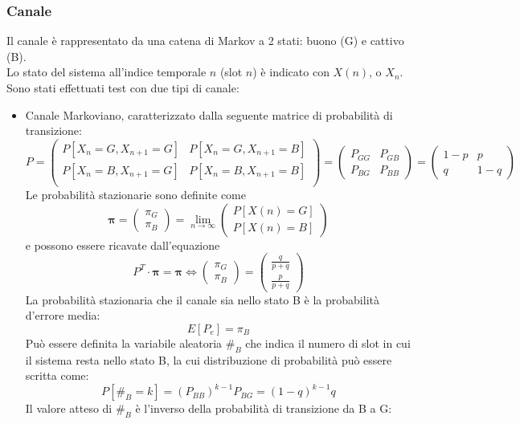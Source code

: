\documentclass[italian, a4paper, 12pt]{article}
\begin{document}
\subsubsection{Canale}
\label{sec:markov}
Il canale è rappresentato da una catena di Markov a 2 stati: buono (G) e cattivo (B).\\
Lo stato del sistema all'indice temporale $n$ (slot $n$) è indicato con $X(n)$, o $X_n$.\\
Sono stati effettuati test con due tipi di canale:
\begin{itemize}
\item Canale Markoviano, caratterizzato dalla seguente matrice di probabilità di transizione:\\
$$P=\begin{pmatrix}
P[X_n=G, X_{n+1}=G] & P[X_n=G, X_{n+1}=B]\\
P[X_n=B, X_{n+1}=G] & P[X_n=B, X_{n+1}=B]\\
\end{pmatrix} = \begin{pmatrix}
P_{GG} & P_{GB} \\
P_{BG} & P_{BB}
\end{pmatrix} =
\begin{pmatrix}
1-p & p \\
q & 1-q
\end{pmatrix}$$
Le probabilità stazionarie sono definite come
$$\bm{\pi} = \begin{pmatrix}
\pi_G\\\pi_B
\end{pmatrix} = \lim_{n \to\infty} \begin{pmatrix}
P[X(n)=G]\\
P[X(n)=B]
\end{pmatrix}$$
e possono essere ricavate dall'equazione
$$P^T\cdot \bm{\pi} = \bm{\pi} \Leftrightarrow \begin{pmatrix}
\pi_G\\
\pi_B
\end{pmatrix}=
\begin{pmatrix}
\frac{q}{p+q}\\
\frac{p}{p+q}
\end{pmatrix}$$
La probabilità stazionaria che il canale sia nello stato B è la probabilità d'errore media:
$$E[P_e] = \pi_B$$
Può essere definita la variabile aleatoria $\#_B$ che indica il numero di slot in cui il sistema resta nello stato B, la cui distribuzione di probabilità può essere scritta come:
$$P[\#_B=k]= \left(P_{BB}\right)^{k-1}P_{BG} = (1-q)^{k-1} q$$
Il valore atteso di $\#_B$ è l'inverso della probabilità di transizione da B a G:

\end{itemize}
\end{document}

